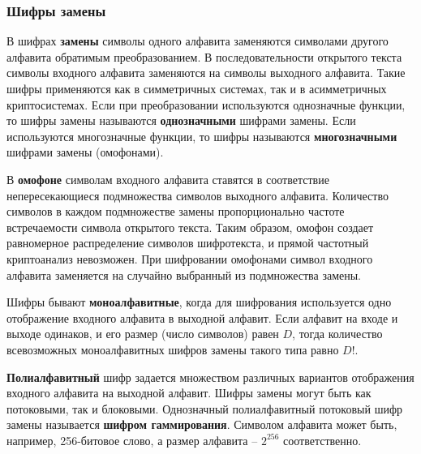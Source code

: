 \subsubsection{Шифры замены}

В шифрах \textbf{замены} символы одного алфавита заменяются символами другого алфавита обратимым преобразованием. В последовательности открытого текста символы входного алфавита заменяются на символы выходного алфавита. Такие шифры применяются как в симметричных системах, так и в асимметричных криптосистемах. Если при преобразовании используются однозначные функции, то шифры замены называются \textbf{однозначными} шифрами замены. Если используются многозначные функции, то шифры называются \textbf{многозначными} шифрами замены (омофонами).

В \textbf{омофоне} символам входного алфавита ставятся в соответствие непересекающиеся подмножества символов выходного алфавита. Количество символов в каждом подмножестве замены пропорционально частоте встречаемости символа открытого текста. Таким образом, омофон создает равномерное распределение символов шифротекста, и прямой частотный криптоанализ невозможен. При шифровании омофонами символ входного алфавита заменяется на случайно выбранный из подмножества замены.

Шифры бывают \textbf{моноалфавитные}, когда для шифрования используется одно отображение входного алфавита в выходной алфавит. Если алфавит на входе и выходе одинаков, и его размер (число символов) равен $D$, тогда количество всевозможных моноалфавитных шифров замены такого типа равно $D!$.

\textbf{Полиалфавитный} шифр задается множеством различных вариантов отображения входного алфавита на выходной алфавит. Шифры замены могут быть как потоковыми, так и блоковыми. Однозначный полиалфавитный потоковый шифр замены называется \textbf{шифром гаммирования}. Символом алфавита может быть, например, 256-битовое слово, а размер алфавита -- $2^{256}$ соответственно.
